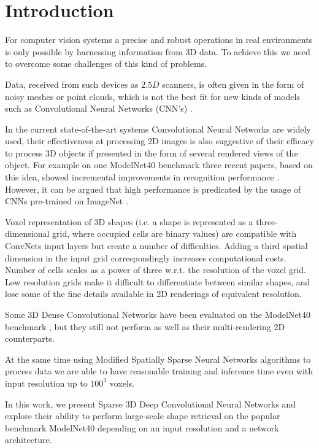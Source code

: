 \section{Introduction}

For computer vision systems a precise and robust operations in real environments is only possible by harnessing information from 3D data. To achieve this we need to overcome some challenges of this kind of problems.

Data, received from such devices as $2.5D$ scanners, is often given in the form of noisy meshes or point clouds, which is not the best fit for new kinds of models such as Convolutional Neural Networks (CNN's) \cite{lecun1995convolutional}.

In the current state-of-the-art systems Convolutional Neural Networks are widely used, their effectiveness at processing 2D images is also suggestive of their efficacy to process 3D objects if presented in the form of several rendered views of the object. For example on one ModelNet40 \cite{wu20153d} benchmark three recent papers, based on this idea, showed incremental improvements in recognition performance \cite{su15mvcnn,johns2016pairwise,hegde2016fusionnet}. However, it can be argued that high performance is predicated by the usage of CNNs pre-trained on ImageNet \cite{deng2009imagenet}.

Voxel representation of 3D shapes (i.e. a shape is represented as a three-dimensional grid, where occupied cells are binary values) are compatible with ConvNets input layers but create a number of difficulties.
Adding a third spatial dimension in the input grid correspondingly increases computational costs. Number of cells scales as a power of three w.r.t. the resolution of the voxel grid. Low resolution grids make it difficult to differentiate between similar shapes, and lose some of the fine details available in 2D renderings of equivalent resolution.

Some 3D Dense Convolutional Networks have been evaluated on the ModelNet40 benchmark \cite{maturana2015voxnet,sedaghat2016orientation,wu20153d,brock2016generative}, but they still not perform as well as their multi-rendering 2D counterparts.

At the same time using Modified Spatially Sparse Neural Networks algorithms \cite{graham2014spatially} to process data we are able to have reasonable training and inference time even with input resolution up to $100^3$ voxels.

In this work, we present Sparse 3D Deep Convolutional Neural Networks and explore their ability to perform large-scale shape retrieval on the popular benchmark ModelNet40 \cite{wu20153d} depending on an input resolution and a network architecture.

